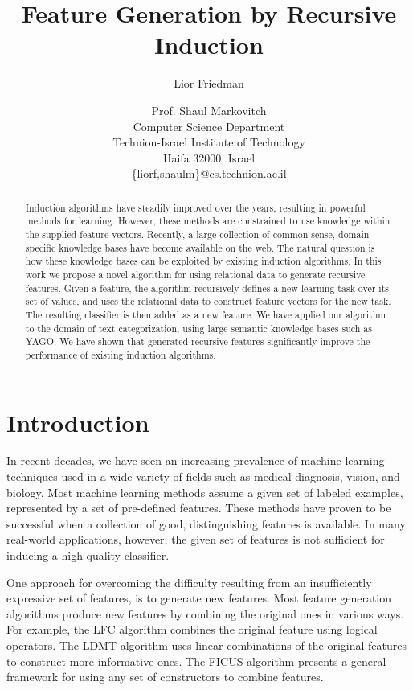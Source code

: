 \documentclass{article}
\title{Feature Generation by Recursive Induction}
\author{Lior Friedman \and Prof. Shaul Markovitch\\
	Computer Science Department \\
	Technion-Israel Institute of Technology\\
	Haifa 32000, Israel\\
	\{liorf,shaulm\}@cs.technion.ac.il}
\theoremstyle{definition}
\begin{document}
\maketitle

\begin{abstract}
  Induction algorithms have steadily improved over the years, resulting in powerful methods for learning. However, these methods are constrained to use knowledge within the supplied feature vectors. Recently, a large collection of common-sense, domain specific knowledge bases have become available on the web. The natural question is how these knowledge bases can be exploited by existing induction algorithms.
  In this work we propose a novel algorithm for using relational data to generate recursive features. Given a feature, the algorithm recursively defines a new learning task over its set of values, and uses the relational data to construct feature vectors for the new task. The resulting classifier is then added as a new feature.
  We have applied our algorithm to the domain of text categorization, using large semantic knowledge bases such as YAGO. We have shown that generated recursive features significantly improve the performance of existing induction algorithms.
\end{abstract}

\section{Introduction}
\label{sec:Intro}
In recent decades, we have seen an increasing prevalence of machine learning techniques used in a wide variety of fields such as medical diagnosis, vision, and biology.
Most machine learning methods assume a given set of labeled examples, represented by a set of
pre-defined features. These methods have proven to be successful when a collection of good,
distinguishing features is available.
In many real-world applications, however, the given set of features is not sufficient for inducing a high quality classifier.

One approach for overcoming the difficulty resulting from an insufficiently expressive set of features, is to generate new features.  Most feature generation algorithms produce new features by combining the original ones in various ways.  For example, the LFC algorithm \citep{ragavan1993complex} combines the original feature using logical operators.  The LDMT algorithm \citep{utgo1991linear} uses linear combinations of the original features to construct more informative ones.  The FICUS algorithm \citep{markovitch2002feature} presents a general framework for using any set of constructors to combine features.
\end{document}
